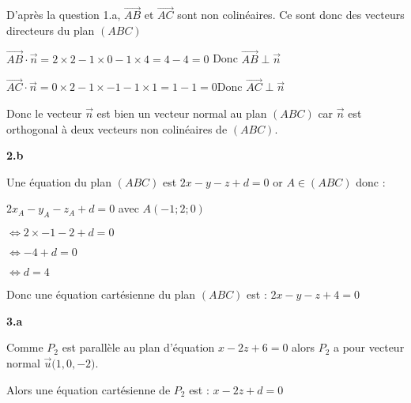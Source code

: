 \documentclass{article}
\begin{document}
\noindent D'après la question 1.a, $\overrightarrow{AB}$ et $\overrightarrow{AC}$ sont non colinéaires. Ce sont donc des vecteurs directeurs du plan $(ABC)$

\vspace{2mm}
$\overrightarrow{AB} \cdot \overrightarrow{n} = 2 \times 2 -1 \times 0 - 1 \times 4 = 4 - 4 = 0 $ \qquad  Donc $\overrightarrow{AB} \perp \overrightarrow{n}$

\vspace{2mm}

$\overrightarrow{AC} \cdot \overrightarrow{n} = 0 \times 2 - 1 \times - 1 - 1 \times 1 = 1 - 1 = 0$\qquad Donc $\overrightarrow{AC} \perp \overrightarrow{n}$
\vspace{2mm}

\noindent Donc le vecteur $\overrightarrow{n}$ est bien un vecteur normal au plan $(ABC)$ car $\overrightarrow{n}$ est orthogonal à deux vecteurs non colinéaires de $(ABC)$. 

\vspace{2mm}

\textbf{2.b}

\vspace{2mm}

\noindent Une équation du plan $(ABC)$ est $2x-y-z+d=0$ or $A \in (ABC)$ donc :

\vspace{2mm}

$2x_A - y_A - z_A + d = 0$ \qquad avec $A(-1; 2; 0)$

$\Leftrightarrow 2 \times -1 - 2 + d = 0$

$\Leftrightarrow -4 + d=0$

$\Leftrightarrow d = 4$

\vspace{2mm}

\noindent Donc une équation cartésienne du plan $(ABC)$ est : $2x - y - z + 4 = 0$

\vspace{2mm}

\textbf{3.a}

\vspace{2mm}

\noindent Comme $P_2$ est parallèle au plan d'équation $x - 2z + 6 = 0$ alors $P_2$ a pour vecteur normal $\overrightarrow{u} \Big(1, 0, -2\Big)$.

\noindent Alors une équation cartésienne de $P_2$ est : $x - 2z + d = 0$

\vspace{2mm}
\end{document}
